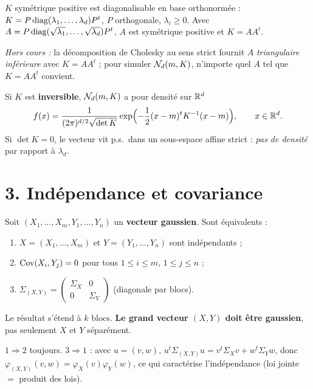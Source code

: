 \documentclass[11pt,a4paper]{article}
\begin{document}
\begin{lemme}\label{C5:racine}
$K$ symétrique positive est diagonalisable en base orthonormée : $K=P\operatorname{diag}(\lambda_1,\dots,\lambda_d)P^t$, $P$ orthogonale, $\lambda_i\ge0$.
Avec $A=P\operatorname{diag}(\sqrt{\lambda_1},\dots,\sqrt{\lambda_d})P^t$, $A$ est symétrique positive et $K=AA^t$.
\end{lemme}
\begin{remarque}
\emph{Hors cours :} la décomposition de Cholesky au sens strict fournit $A$ \emph{triangulaire inférieure} avec $K=AA^t$ ;
pour simuler $\mathcal{N}_d(m,K)$, n'importe quel $A$ tel que $K=AA^t$ convient.
\end{remarque}

\begin{horscours}[densité]\label{C5:densite}
Si $K$ est \textbf{inversible}, $\mathcal{N}_d(m,K)$ a pour densité sur $\mathbb{R}^d$
\[f(x)=\frac{1}{(2\pi)^{d/2}\sqrt{\det K}}\exp\Bigl(-\frac12(x-m)^tK^{-1}(x-m)\Bigr),\qquad x\in\mathbb{R}^d.\]
Si $\det K=0$, le vecteur vit p.s.\ dans un sous-espace affine strict : \emph{pas de densité} par rapport à $\lambda_d$.
\end{horscours}

\section*{3. Indépendance et covariance}

\begin{theoreme}[blocs]\label{C5:blocs}
Soit $(X_1,\dots,X_m,Y_1,\dots,Y_n)$ un \textbf{vecteur gaussien}. Sont équivalents :
\begin{enumerate}
  \item $X=(X_1,\dots,X_m)$ et $Y=(Y_1,\dots,Y_n)$ sont indépendants ;
  \item $\operatorname{Cov}(X_i,Y_j)=0$ pour tous $1\le i\le m$, $1\le j\le n$ ;
  \item $\Sigma_{(X,Y)}=\begin{pmatrix}\Sigma_X&0\\0&\Sigma_Y\end{pmatrix}$ (diagonale par blocs).
\end{enumerate}
Le résultat s'étend à $k$ blocs. \textbf{Le grand vecteur $(X,Y)$ doit être gaussien}, pas seulement $X$ et $Y$ séparément.
\end{theoreme}
\begin{idee}
$1\Rightarrow2$ toujours. $3\Rightarrow1$ : avec $u=(v,w)$, $u^t\Sigma_{(X,Y)}u=v^t\Sigma_Xv+w^t\Sigma_Yw$, donc
$\varphi_{(X,Y)}(v,w)=\varphi_X(v)\varphi_Y(w)$, ce qui caractérise l'indépendance (loi jointe $=$ produit des lois).
\end{idee}
\end{document}
